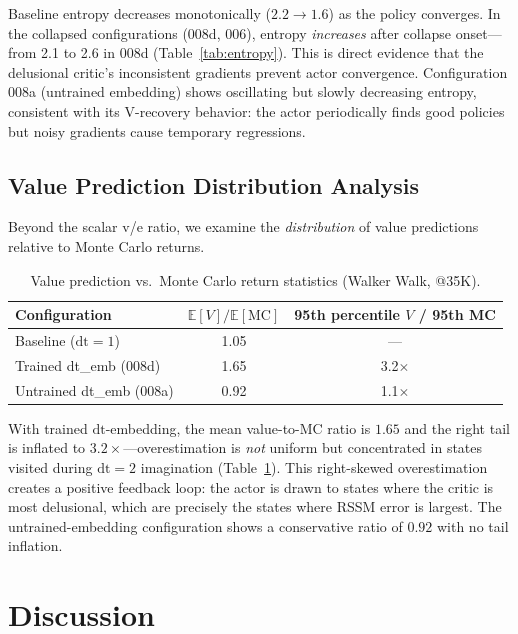 \documentclass[10pt,letterpaper]{article}
\begin{document}
Baseline entropy decreases monotonically ($2.2 \to 1.6$) as the policy converges. In the collapsed configurations (008d, 006), entropy \emph{increases} after collapse onset---from 2.1 to 2.6 in 008d (Table~\ref{tab:entropy}). This is direct evidence that the delusional critic's inconsistent gradients prevent actor convergence. Configuration 008a (untrained embedding) shows oscillating but slowly decreasing entropy, consistent with its V-recovery behavior: the actor periodically finds good policies but noisy gradients cause temporary regressions.


\subsection{Value Prediction Distribution Analysis}
\label{sec:distributional}

Beyond the scalar v/e ratio, we examine the \emph{distribution} of value predictions relative to Monte Carlo returns.

\begin{table}[h]
\centering
\caption{Value prediction vs.\ Monte Carlo return statistics (Walker Walk, @35K).}
\label{tab:distributional}
\begin{tabular}{lcc}
\toprule
\textbf{Configuration} & $\mathbb{E}[V] / \mathbb{E}[\text{MC}]$ & 95th percentile $V$ / 95th MC \\
\midrule
Baseline ($\mathrm{dt}{=}1$) & 1.05 & --- \\
Trained dt\_emb (008d) & 1.65 & 3.2$\times$ \\
Untrained dt\_emb (008a) & 0.92 & 1.1$\times$ \\
\bottomrule
\end{tabular}
\end{table}

With trained $\mathrm{dt}$-embedding, the mean value-to-MC ratio is $1.65$ and the right tail is inflated to $3.2\times$---overestimation is \emph{not} uniform but concentrated in states visited during $\mathrm{dt}{=}2$ imagination (Table~\ref{tab:distributional}). This right-skewed overestimation creates a positive feedback loop: the actor is drawn to states where the critic is most delusional, which are precisely the states where RSSM error is largest. The untrained-embedding configuration shows a conservative ratio of $0.92$ with no tail inflation.


\section{Discussion}
\label{sec:discussion}
\end{document}
